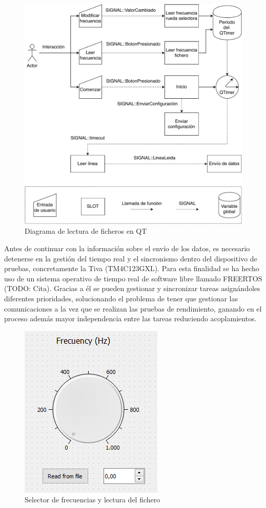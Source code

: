         \begin{figure} [H] 
                \centering
                        \includegraphics[width =\linewidth]{figuras/CompleteFileRead.pdf}
                \caption{Diagrama de lectura de ficheros en QT}
                \label{fig:CompleteFileRead}
        \end{figure}

        Antes de continuar con la información sobre el envío de los datos, es necesario detenerse en la gestión del tiempo real y el sincronismo dentro del dispositivo de pruebas, concretamente la Tiva (TM4C123GXL). Para esta finalidad se ha hecho uso de un sistema operativo de tiempo real de software libre llamado FREERTOS (TODO: Cita). Gracias a él se pueden gestionar y sincronizar tareas asignándoles diferentes prioridades, solucionando el problema de tener que gestionar las comunicaciones a la vez que se realizan las pruebas de rendimiento, ganando en el proceso además mayor independencia entre las tareas reduciendo acoplamientos.
        
        \begin{figure}[H]
                \centering
                        \includegraphics[width =0.4\linewidth]{figuras/FrecKnob.png}
                \caption{Selector de frecuencias y lectura del fichero}
                \label{fig:frecKnob}
        \end{figure}

